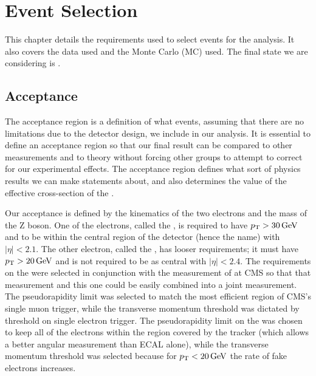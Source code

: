 \chapter{Event Selection}
\label{event_selection_chapter}

This chapter details the requirements used to select events for the analysis.
It also covers the data used and the Monte Carlo (MC) used. The final state we
are considering is \Ztoee.

\section{Acceptance}
\label{sec:acceptance}

The acceptance region is a definition of what events, assuming that there are
no limitations due to the detector design, we include in our analysis. It is
essential to define an acceptance region so that our final result can be
compared to other measurements and to theory without forcing other groups to
attempt to correct for our experimental effects. The acceptance region defines
what sort of physics results we can make statements about, and also determines
the value of the effective cross-section of the \Z.

Our acceptance is defined by the kinematics of the two electrons and the mass
of the Z boson. One of the electrons, called the \CentralElectron, is required
to have $p_{\mathrm{T}} > 30 \,\text{Ge\hspace{-.08em}V}$ and to be within the central region of the detector
(hence the name) with $|\eta| < 2.1$. The other electron, called the
\ExtendedElectron, has looser requirements; it must have $p_{\mathrm{T}} > 20 \,\text{Ge\hspace{-.08em}V}$ and is
not required to be as central with $|\eta| < 2.4$. The requirements on the
\CentralElectron were selected in conjunction with the \Ztomumu measurement of
\phistar at CMS so that that measurement and this one could be easily combined
into a joint measurement. The pseudorapidity limit was selected to match the
most efficient region of CMS's single muon trigger, while the transverse
momentum threshold was dictated by threshold on single electron trigger. The
pseudorapidity limit on the \ExtendedElectron was chosen to keep all of the
electrons within the region covered by the tracker (which allows a better
angular measurement than ECAL alone), while the transverse momentum threshold
was selected because for $p_{\mathrm{T}} < 20 \,\text{Ge\hspace{-.08em}V}$ the rate of fake electrons increases.

